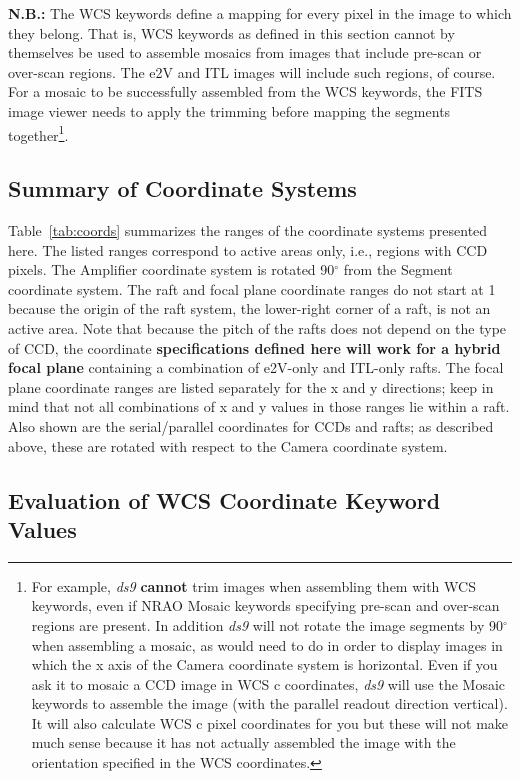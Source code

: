 \documentclass{article}[12pt]
\begin{document}
{{\bf N.B.:}  The WCS keywords define a mapping for every pixel in the image to which they belong.  That is, WCS keywords as defined in this section cannot by themselves be used to assemble mosaics from images that include pre-scan or over-scan regions.  The e2V and ITL images will include such regions, of course.  For a mosaic to be successfully assembled from the WCS keywords, the FITS image viewer needs to apply the trimming before mapping the segments together\footnote{For example, {\it ds9} {\bf cannot} trim images when assembling them with WCS keywords, even if NRAO Mosaic keywords specifying pre-scan and over-scan regions are present.  In addition {\it ds9} will not rotate the image segments by 90$^\circ$ when assembling a mosaic, as would need to do in order to display images in which the x axis of the Camera coordinate system is horizontal.  Even if you ask it to mosaic a CCD image in WCS c coordinates, {\it ds9} will use the Mosaic keywords to assemble the image (with the parallel readout direction vertical).  It will also calculate WCS c pixel coordinates for you but these will not make much sense because it has not actually assembled the image with the orientation specified in the WCS coordinates.}.

\subsection{Summary of Coordinate Systems}
Table~\ref{tab:coords} summarizes the ranges of the coordinate systems presented here.  The listed ranges correspond to active areas only, i.e., regions with CCD pixels.  The Amplifier coordinate system is rotated 90$^\circ$ from the Segment coordinate system.  The raft and focal plane coordinate ranges do not start at 1 because the origin of the raft system, the lower-right corner of a raft, is not an active area.  Note that because the pitch of the rafts does not depend on the type of CCD, the coordinate {\bf specifications defined here will work for a hybrid focal plane} containing a combination of e2V-only and ITL-only rafts.  The focal plane coordinate ranges are listed separately for the x and y directions; keep in mind that not all combinations of x and y values in those ranges lie within a raft.  Also shown are the serial/parallel coordinates for CCDs and rafts; as described above, these are rotated with respect to the Camera coordinate system.

\subsection{Evaluation of WCS Coordinate Keyword Values\label{sec:wcscoords}}

}
\end{document}
